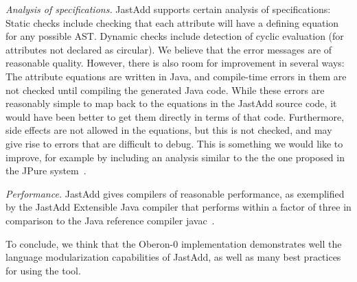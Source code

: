 \emph{Analysis of specifications.}
JastAdd supports certain analysis of specifications: Static checks include checking that each attribute will have a defining equation for any possible AST. Dynamic checks include detection of cyclic evaluation (for attributes not declared as circular). We believe that the error messages are of reasonable quality. However, there is also room for improvement in several ways: The attribute equations are written in Java, and compile-time errors in them are not checked until compiling the generated Java code. While these errors are reasonably simple to map back to the equations in the JastAdd source code, it would have been better to get them directly in terms of that code. Furthermore, side effects are not allowed in the equations, but this is not checked, and may give rise to errors that are difficult to debug. This is something we would like to improve, for example by including an analysis similar to the the one proposed in the JPure system~\cite{pearce11cc}.

\emph{Performance.} JastAdd gives compilers of reasonable performance, as exemplified by the JastAdd Extensible Java compiler that performs within a factor of three in comparison to the Java reference compiler javac~\cite{ekman07oopsla}. 

To conclude, we think that the Oberon-0 implementation demonstrates well the language modularization capabilities of JastAdd, as well as many best practices for using the tool.

